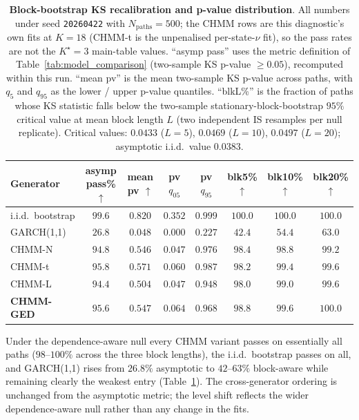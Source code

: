 \begin{table}[t]
\centering
\small
\caption{\textbf{Block-bootstrap KS recalibration and p-value distribution}. All numbers under seed \texttt{20260422} with $N_{\text{paths}} = 500$; the CHMM rows are this diagnostic's own fits at $K = 18$ (CHMM-t is the unpenalised per-state-$\nu$ fit), so the pass rates are not the $K^\star = 3$ main-table values. ``asymp pass'' uses the metric definition of Table~\ref{tab:model_comparison} (two-sample KS p-value $\geq 0.05$), recomputed within this run. ``mean pv'' is the mean two-sample KS p-value across paths, with $q_5$ and $q_{95}$ as the lower / upper p-value quantiles. ``blkL\%'' is the fraction of paths whose KS statistic falls below the two-sample stationary-block-bootstrap $95\%$ critical value at mean block length $L$ (two independent IS resamples per null replicate). Critical values: $0.0433$ ($L = 5$), $0.0469$ ($L = 10$), $0.0497$ ($L = 20$); asymptotic i.i.d.\ value $0.0383$.}
\label{tab:ks_block_bootstrap}
\begin{tabular}{l c c c c c c c}
\toprule
Generator & asymp pass\% $\uparrow$ & mean pv $\uparrow$ & pv $q_{05}$ & pv $q_{95}$ & blk5\% $\uparrow$ & blk10\% $\uparrow$ & blk20\% $\uparrow$ \\
\midrule
i.i.d.\ bootstrap & $99.6$ & $0.820$ & $0.352$ & $0.999$ & $100.0$ & $100.0$ & $100.0$ \\
GARCH(1,1)        & $26.8$ & $0.048$ & $0.000$ & $0.227$ & $42.4$ & $54.4$ & $63.0$ \\
CHMM-N            & $94.8$ & $0.546$ & $0.047$ & $0.976$ & $98.4$ & $98.8$ & $99.2$ \\
CHMM-t            & $\mathbf{95.8}$ & $\mathbf{0.571}$ & $0.060$ & $0.987$ & $98.2$ & $99.4$ & $99.6$ \\
CHMM-L            & $94.4$ & $0.504$ & $0.047$ & $0.948$ & $98.0$ & $99.0$ & $99.6$ \\
\textbf{CHMM-GED} & $95.6$ & $0.547$ & $0.064$ & $0.968$ & $\mathbf{98.8}$ & $\mathbf{99.6}$ & $\mathbf{100.0}$ \\
\bottomrule
\end{tabular}
\end{table}

Under the dependence-aware null every CHMM variant passes on essentially all paths ($98$--$100\%$ across the three block lengths), the i.i.d.\ bootstrap passes on all, and GARCH(1,1) rises from $26.8\%$ asymptotic to $42$--$63\%$ block-aware while remaining clearly the weakest entry (Table~\ref{tab:ks_block_bootstrap}). The cross-generator ordering is unchanged from the asymptotic metric; the level shift reflects the wider dependence-aware null rather than any change in the fits.

